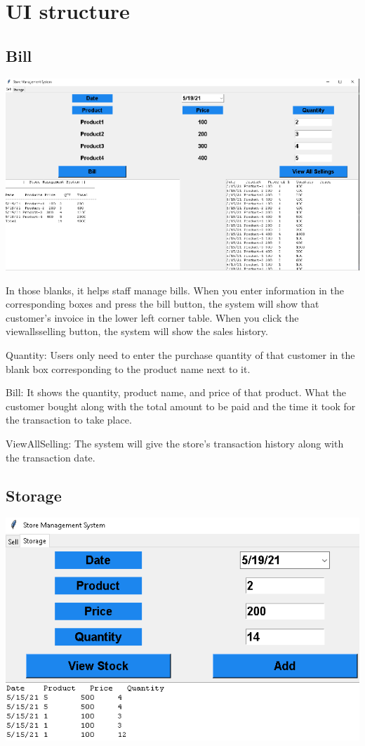 \newpage
\section{UI structure}

\subsection{Bill}
\includegraphics{images/Demo1 Bill.png}


\hspace{0.7cm}
In those blanks, it helps staff manage bills.
When you enter information in the corresponding boxes and press the bill button, the system will show that customer's invoice in the lower left corner table. When you click the viewallsselling button, the system will show the sales history.


   \item Quantity: Users only need to enter the purchase quantity of that customer in the blank box corresponding to the product name next to it.
   \item Bill: It shows the quantity, product name, and price of that product. What the customer bought along with the total amount to be paid and the time it took for the transaction to take place.
   \item ViewAllSelling: The system will give the store's transaction history along with the transaction date.
   
\newpage
\subsection{Storage}
\vspace{1cm}
\includegraphics{images/Demo2 Stock.png}



